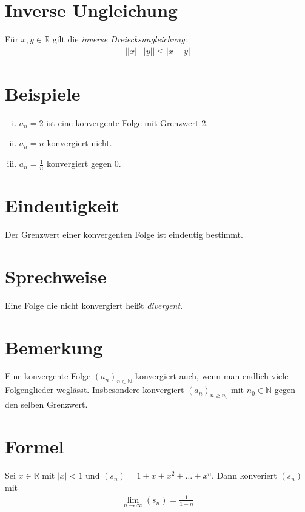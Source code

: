 \documentclass{scrreprt}
\newcommand{\NN}{\mathbb{N}}
\newcommand{\RR}{\mathbb{R}}
\begin{document}
    \section{Inverse Ungleichung}
    Für $x,y \in \RR$ gilt die \emph{inverse Dreiecksungleichung}:
    \begin{align*}
        ||x| - |y| | \leq |x - y|
    \end{align*}

    \section{Beispiele}
    \begin{enumerate}[i)]
        \item
            $a_n = 2$ ist eine konvergente Folge mit Grenzwert 2. 
        \item
            $a_n = n$ konvergiert nicht.
        \item
            $a_n = \frac{1}{n}$ konvergiert gegen 0. 
    \end{enumerate}

    \section{Eindeutigkeit}
    Der Grenzwert einer konvergenten Folge ist eindeutig bestimmt.

    \section{Sprechweise}
    Eine Folge die nicht konvergiert heißt \emph{divergent}.

    \section{Bemerkung}
    Eine konvergente Folge $(a_n)_{n \in \NN}$ konvergiert auch, wenn man endlich viele Folgenglieder weglässt. Insbesondere konvergiert $(a_n)_{n \geq n_0}$ mit $n_0 \in \NN$ gegen den selben Grenzwert.

    \section{Formel}
    Sei $x \in \RR$ mit $|x| < 1$ und $(s_n) = 1 + x + x^2 + \dots + x^n$. Dann konveriert $(s_n)$ mit
    \begin{align*}
        \lim\limits_{n \to \infty} (s_n) = \frac{1}{1-n}
    \end{align*}
\end{document}
